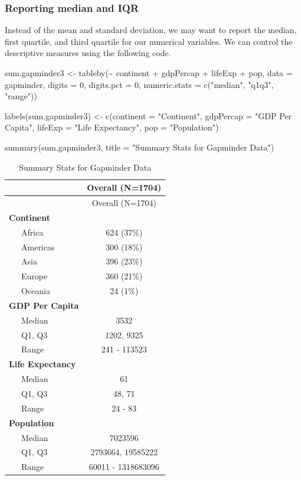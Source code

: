 \documentclass[
]{book}
\makeatletter
\newenvironment{Shaded}{\begin{snugshade}}{\end{snugshade}}
\newcommand{\AttributeTok}[1]{\textcolor[rgb]{0.61,0.61,0.61}{#1}}
\newcommand{\DecValTok}[1]{\textcolor[rgb]{0.06,0.06,0.06}{#1}}
\newcommand{\FunctionTok}[1]{\textcolor[rgb]{0,0,0}{#1}}
\newcommand{\NormalTok}[1]{#1}
\newcommand{\OtherTok}[1]{\textcolor[rgb]{0.37,0.37,0.37}{#1}}
\newcommand{\SpecialCharTok}[1]{\textcolor[rgb]{0,0,0}{#1}}
\newcommand{\StringTok}[1]{\textcolor[rgb]{0.5,0.5,0.5}{#1}}
\newenvironment{kframe}{%
\medskip{}
\setlength{\fboxsep}{.8em}
 \def\at@end@of@kframe{}%
 \ifinner\ifhmode%
  \def\at@end@of@kframe{\end{minipage}}%
  \begin{minipage}{\columnwidth}%
 \fi\fi%
 \def\FrameCommand##1{\hskip\@totalleftmargin \hskip-\fboxsep
 \colorbox{shadecolor}{##1}\hskip-\fboxsep
     \hskip-\linewidth \hskip-\@totalleftmargin \hskip\columnwidth}%
 \MakeFramed {\advance\hsize-\width
   \@totalleftmargin\z@ \linewidth\hsize
   \@setminipage}}%
 {\par\unskip\endMakeFramed%
 \at@end@of@kframe}
\renewenvironment{Shaded}{\begin{kframe}}{\end{kframe}}
\makeatother
\begin{document}
\hypertarget{reporting-median-and-iqr}{%
\subsubsection{Reporting median and IQR}\label{reporting-median-and-iqr}}

Instead of the mean and standard deviation, we may want to report the median, first quartile, and third quartile for our numerical variables. We can control the descriptive measures using the following code.

\begin{Shaded}
\begin{Highlighting}[]
\NormalTok{sum.gapminder3 }\OtherTok{\textless{}{-}} \FunctionTok{tableby}\NormalTok{(}\SpecialCharTok{\textasciitilde{}}\NormalTok{ continent }\SpecialCharTok{+}\NormalTok{ gdpPercap }\SpecialCharTok{+}\NormalTok{ lifeExp }\SpecialCharTok{+}\NormalTok{ pop, }\AttributeTok{data =}\NormalTok{ gapminder, }\AttributeTok{digits =} \DecValTok{0}\NormalTok{, }\AttributeTok{digits.pct =} \DecValTok{0}\NormalTok{, }\AttributeTok{numeric.stats =} \FunctionTok{c}\NormalTok{(}\StringTok{"median"}\NormalTok{, }\StringTok{"q1q3"}\NormalTok{, }\StringTok{"range"}\NormalTok{))}

\FunctionTok{labels}\NormalTok{(sum.gapminder3) }\OtherTok{\textless{}{-}} \FunctionTok{c}\NormalTok{(}\AttributeTok{continent =} \StringTok{"Continent"}\NormalTok{, }\AttributeTok{gdpPercap =} \StringTok{"GDP Per Capita"}\NormalTok{, }\AttributeTok{lifeExp =} \StringTok{"Life Expectancy"}\NormalTok{, }\AttributeTok{pop =} \StringTok{"Population"}\NormalTok{)}
\end{Highlighting}
\end{Shaded}

\begin{Shaded}
\begin{Highlighting}[]
\FunctionTok{summary}\NormalTok{(sum.gapminder3, }\AttributeTok{title =} \StringTok{"Summary Stats for Gapminder Data"}\NormalTok{)}
\end{Highlighting}
\end{Shaded}

\begin{longtable}[]{@{}lc@{}}
\caption{Summary Stats for Gapminder Data}\tabularnewline
\toprule
& Overall (N=1704)\tabularnewline
\midrule
\endfirsthead
\toprule
& Overall (N=1704)\tabularnewline
\midrule
\endhead
\textbf{Continent} &\tabularnewline
~~~Africa & 624 (37\%)\tabularnewline
~~~Americas & 300 (18\%)\tabularnewline
~~~Asia & 396 (23\%)\tabularnewline
~~~Europe & 360 (21\%)\tabularnewline
~~~Oceania & 24 (1\%)\tabularnewline
\textbf{GDP Per Capita} &\tabularnewline
~~~Median & 3532\tabularnewline
~~~Q1, Q3 & 1202, 9325\tabularnewline
~~~Range & 241 - 113523\tabularnewline
\textbf{Life Expectancy} &\tabularnewline
~~~Median & 61\tabularnewline
~~~Q1, Q3 & 48, 71\tabularnewline
~~~Range & 24 - 83\tabularnewline
\textbf{Population} &\tabularnewline
~~~Median & 7023596\tabularnewline
~~~Q1, Q3 & 2793664, 19585222\tabularnewline
~~~Range & 60011 - 1318683096\tabularnewline
\bottomrule
\end{longtable}
\end{document}

